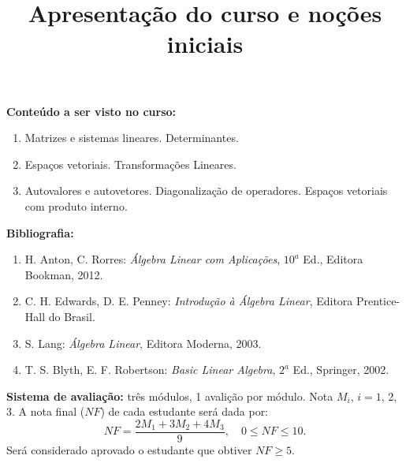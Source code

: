 \documentclass{beamer}
\title{Apresentação do curso e noções iniciais}
\author[\autor]{\autor}
\institute[\instituto]{\instituto}
\date{}
\begin{document}
    \begin{frame}
        \maketitle
    \end{frame}


    \begin{frame}
        {\bf Conteúdo a ser visto no curso:}
        \begin{enumerate}[label={\roman*})]
            \item Matrizes e sistemas lineares. Determinantes.

            \item Espaços vetoriais. Transformações Lineares.

            \item Autovalores e autovetores. Diagonalização de operadores. Espaços vetoriais com produto interno.
        \end{enumerate}
    \end{frame}

    \begin{frame}
        {\bf Bibliografia:}
        \begin{enumerate}[label={\arabic*})]
            \item H. Anton, C. Rorres: {\it {\'A}lgebra Linear com Aplicações}, $10^a$ Ed., Editora Bookman, 2012.

        \item C. H. Edwards, D. E. Penney: {\it Introdução à Álgebra Linear}, Editora Prentice-Hall do Brasil.

            \item S. Lang: {\it Álgebra Linear}, Editora Moderna, 2003.

            \item T. S. Blyth, E. F. Robertson: {\it Basic Linear Algebra}, $2^a$ Ed., Springer, 2002.
        \end{enumerate}
    \end{frame}

    \begin{frame}
        {\bf{Sistema de avaliação:}} três módulos, 1 avalição por módulo.
            Nota $M_i$, $i=1$, 2, 3. A nota final ($NF$) de cada estudante ser\'a dada por:
        \[
            NF = \dfrac{2M_1 + 3M_2 + 4M_3}{9}, \quad 0 \le NF \le 10.
        \]
        Ser\'a considerado aprovado o estudante que obtiver $NF \ge 5$.
    \end{frame}
\end{document}
